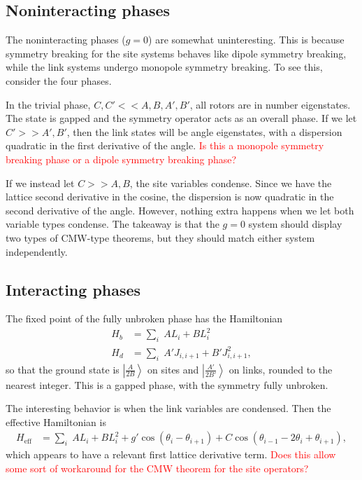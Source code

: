 \documentclass[12pt]{article}
\newcommand{\note}[1]{\textcolor{red}{#1}}
\newcommand{\nn}{\nonumber\\}
\begin{document}
\subsection{Noninteracting phases}

The noninteracting phases ($g=0$) are somewhat uninteresting. This is because symmetry breaking for the site systems behaves like dipole symmetry breaking, while the link systems undergo monopole symmetry breaking. To see this, consider the four phases.

In the trivial phase, $C,C'<<A,B,A',B'$, all rotors are in number eigenstates. The state is gapped and the symmetry operator acts as an overall phase. If we let $C'>>A',B'$, then the link states will be angle eigenstates, with a dispersion quadratic in the first derivative of the angle. \note{Is this a monopole symmetry breaking phase or a dipole symmetry breaking phase?}

If we instead let $C>>A,B$, the site variables condense. Since we have the lattice second derivative in the cosine, the dispersion is now quadratic in the second derivative of the angle. However, nothing extra happens when we let both variable types condense. The takeaway is that the $g=0$ system should display two types of CMW-type theorems, but they should match either system independently.

\subsection{Interacting phases}

The fixed point of the fully unbroken phase has the Hamiltonian
\begin{align}
H_b &= \sum_i \; A  L_i + B L_i^2 \nn
H_d &= \sum_i \; A' J_{i,i+1} + B' J_{i,i+1}^2,
\end{align}
so that the ground state is $\left|\frac{A}{2B}\right\rangle$ on sites and $\left|\frac{A'}{2B'}\right\rangle$ on links, rounded to the nearest integer. This is a gapped phase, with the symmetry fully unbroken.

The interesting behavior is when the link variables are condensed. Then the effective Hamiltonian is 
\begin{align}
H_\text{eff} &= \sum_i\; AL_i+BL_i^2 + g'\cos \left( \theta_i-\theta_{i+1} \right) + C\cos \left( \theta_{i-1} -2\theta_i + \theta_{i+1} \right),
\end{align}
which appears to have a relevant first lattice derivative term. \note{Does this allow some sort of workaround for the CMW theorem for the site operators?}
\end{document}
